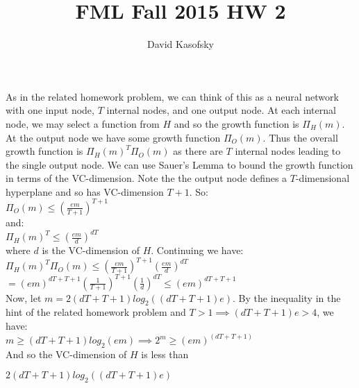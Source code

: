 \documentclass[]{article}
\title{FML Fall 2015 HW 2}
\author{David Kasofsky}
\begin{document}
\section{}
\subsection{}
As in the related homework problem, we can think of this as a neural network with one input node, $T$ internal nodes, and one output node. At each internal node, we may select a function from $H$ and so the growth function is $\Pi_H(m)$. At the output node we have some growth function $\Pi_O(m)$. Thus the overall growth function is $\Pi_H(m)^T\Pi_O(m)$ as there are $T$ internal nodes leading to the single output node. We can use Sauer's Lemma to bound the growth function in terms of the VC-dimension. Note the the output node defines a $T$-dimensional hyperplane and so has VC-dimension $T+1$. So:\\

$\Pi_O(m) \le (\frac{e m}{T+1})^{T+1}$\\

and:\\ 

$\Pi_H(m)^T \le (\frac{e m}{d})^{dT} $\\

where $d$ is the VC-dimension of $H$. Continuing we have:\\

$\Pi_H(m)^T\Pi_O(m) \le (\frac{e m}{T+1})^{T+1} (\frac{e m}{d})^{dT}$\\

$= (e m)^{dT+T+1} (\frac{1}{T+1})^{T+1} (\frac{1}{d})^{dT} \le (e m)^{dT+T+1}$\\

Now, let $m = 2(dT+T+1)log_2((dT+T+1)e)$. By the inequality in the hint of the related homework problem and $T > 1 \implies (dT+T+1)e > 4$, we have:\\

$m \ge (dT+T+1) log_2(e m) \implies 2^m \ge (e m)^{(dT+T+1)}$\\

And so the VC-dimension of $H$ is less than
\begin{center}
	$2(dT+T+1)log_2((dT+T+1)e)$
\end{center}

\pagebreak

\section{}
\end{document}
